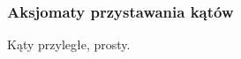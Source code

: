 \subsubsection{Aksjomaty przystawania kątów}
\begin{axiom}[przystawania, C4]
    \loremipsum
\end{axiom}

\begin{axiom}[przystawania, C5]
    \loremipsum
\end{axiom}

\begin{axiom}[przystawania, C6]
    \loremipsum
\end{axiom}

Kąty przyległe, prosty.